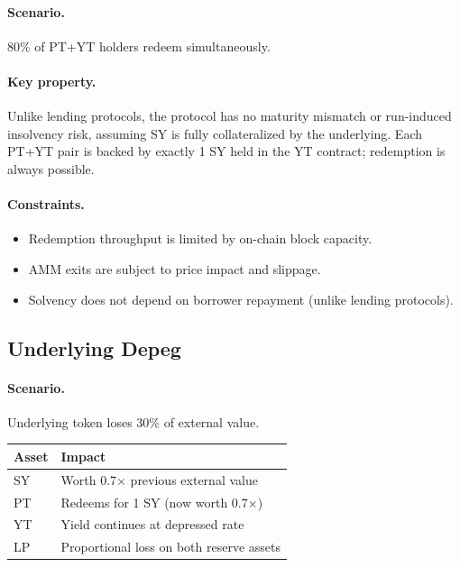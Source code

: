 \paragraph{Scenario.} 80\% of PT+YT holders redeem simultaneously.

\paragraph{Key property.} Unlike lending protocols, the protocol has no maturity mismatch or run-induced insolvency risk, assuming SY is fully collateralized by the underlying. Each PT+YT pair is backed by exactly 1 SY held in the YT contract; redemption is always possible.

\paragraph{Constraints.}
\begin{itemize}
\item Redemption throughput is limited by on-chain block capacity.
\item AMM exits are subject to price impact and slippage.
\item Solvency does not depend on borrower repayment (unlike lending protocols).
\end{itemize}

\subsection{Underlying Depeg}

\paragraph{Scenario.} Underlying token loses 30\% of external value.

\begin{center}
\begin{tabular}{ll}
\toprule
\textbf{Asset} & \textbf{Impact} \\
\midrule
SY & Worth 0.7$\times$ previous external value \\
PT & Redeems for 1 SY (now worth 0.7$\times$) \\
YT & Yield continues at depressed rate \\
LP & Proportional loss on both reserve assets \\
\bottomrule
\end{tabular}
\end{center}

